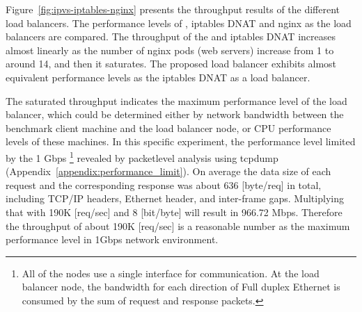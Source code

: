 
Figure~\ref{fig:ipvs-iptables-nginx} presents the throughput results of the different load balancers.
The performance levels of , iptables DNAT and nginx as the load balancers are compared.
The throughput of the  and iptables DNAT increases almost linearly as the number of nginx pods (web servers) increase from 1 to around 14, and then it saturates.
The proposed  load balancer exhibits almost equivalent performance levels as the iptables DNAT as a load balancer.

The saturated throughput indicates the maximum performance level of the load balancer, which could be determined either by network bandwidth between the benchmark client machine and the load balancer node, or CPU performance levels of these machines.
%
In this specific experiment,  the performance level limited by the 1 Gbps \footnote{All of the nodes use a single interface for communication. 
At the load balancer node, the bandwidth for each direction of Full duplex Ethernet is consumed by the sum of request and response packets.
}
 revealed by packet\added[id=2nd]{-}level analysis using tcpdump (Appendix~\ref{appendix:performance_limit}).
%
On average the data size of each request and the corresponding response was about 636 [byte/req] in total, including TCP/IP headers, Ethernet header, and inter-frame gaps.
Multiplying that with 190K [req/sec] and 8 [bit/byte] will result in 966.72 Mbps.
Therefore the throughput of about 190K [req/sec] is a reasonable number as the maximum performance level in 1Gbps network environment.


